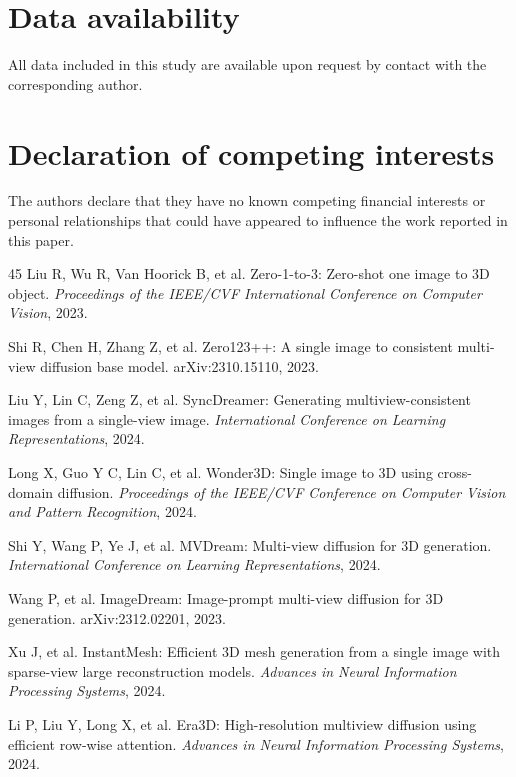 \documentclass[times,twocolumn,final]{elsarticle}
\begin{document}
\section*{Data availability}

All data included in this study are available upon request by contact with the corresponding author.

\section*{Declaration of competing interests}

The authors declare that they have no known competing financial interests or personal relationships that could have appeared to influence the work reported in this paper.


\begin{thebibliography}{45}
Liu R, Wu R, Van Hoorick B, et al. Zero-1-to-3: Zero-shot one image to 3D object. \textit{Proceedings of the IEEE/CVF International Conference on Computer Vision}, 2023.

Shi R, Chen H, Zhang Z, et al. Zero123++: A single image to consistent multi-view diffusion base model. arXiv:2310.15110, 2023.

Liu Y, Lin C, Zeng Z, et al. SyncDreamer: Generating multiview-consistent images from a single-view image. \textit{International Conference on Learning Representations}, 2024.

Long X, Guo Y C, Lin C, et al. Wonder3D: Single image to 3D using cross-domain diffusion. \textit{Proceedings of the IEEE/CVF Conference on Computer Vision and Pattern Recognition}, 2024.

Shi Y, Wang P, Ye J, et al. MVDream: Multi-view diffusion for 3D generation. \textit{International Conference on Learning Representations}, 2024.

Wang P, et al. ImageDream: Image-prompt multi-view diffusion for 3D generation. arXiv:2312.02201, 2023.

Xu J, et al. InstantMesh: Efficient 3D mesh generation from a single image with sparse-view large reconstruction models. \textit{Advances in Neural Information Processing Systems}, 2024.

Li P, Liu Y, Long X, et al. Era3D: High-resolution multiview diffusion using efficient row-wise attention. \textit{Advances in Neural Information Processing Systems}, 2024.


\end{thebibliography}
\end{document}
